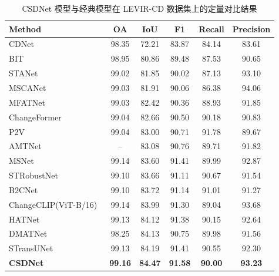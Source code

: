 \begin{table}[!htb]
\centering
\caption{CSDNet 模型与经典模型在 LEVIR-CD 数据集上的定量对比结果}
\label{tab:csdnet_levir}
\begin{tabular}{l c c c c c} 
\toprule
Method & {OA} & {IoU} & {F1} & {Recall} & {Precision} \\
\midrule
CDNet~\cite{Alcantarilla2016StreetviewCD} & 98.35 & 72.21 & 83.87 & 84.14 & 83.61 \\
BIT~\cite{chen_remote_2022} & 98.95 & 80.86 & 89.48 & 87.53 & 90.65 \\
STANet~\cite{chen_spatial-temporal_2020} & 99.02 & 81.85 & 90.02 & 87.13 & 93.10 \\
MSCANet~\cite{m_liu_cnn-transformer_2022} & 99.03 & 81.91 & 90.06 & 86.38 & 94.06 \\
MFATNet~\cite{Mao2022MFATNetMF} & 99.03 & 82.42 & 90.36 & 88.93 & 91.85 \\
ChangeFormer~\cite{bandara2022transformer} & 99.04 & 82.66 & 90.50 & 90.18 & 90.83 \\
P2V~\cite{lin_transition_2023} & 99.04 & 83.00 & 90.71 & 91.78 & 89.67 \\
AMTNet~\cite{Liu2023AnAM} & {--} & 83.08 & 90.76 & 89.71 & 91.82 \\
MSNet~\cite{Liu2025NetworkAD} & 99.14 & 83.60 & 91.41 & 89.99 & 92.87 \\
STRobustNet~\cite{Zhang2025STRobustNetEC} & 99.10 & 83.66 & 91.11 & 90.67 & 91.54 \\
B2CNet~\cite{Zhang2024B2CNetAP} & 99.10 & 83.72 & 91.14 & 91.01 & 91.27 \\
ChangeCLIP(ViT-B/16)~\cite{dong2024changeclip} & 99.14 & 83.99 & 91.30 & 89.04 & 93.68 \\
HATNet~\cite{Xu2024HybridAT} & 99.13 & 84.12 & 91.38 & 90.15 & 92.64 \\
DMATNet~\cite{Song2022RemoteSI} & 98.25 & 84.13 & 90.75 & 89.98 & 91.56 \\
STransUNet~\cite{Yuan2022STransUNetAS} & 99.13 & 84.19 & 91.41 & 90.55 & 92.30 \\
\textbf{CSDNet} & \textbf{99.16} & \textbf{84.47} & \textbf{91.58} & \textbf{90.00} & \textbf{93.23} \\
\bottomrule
\end{tabular}%
\end{table}


